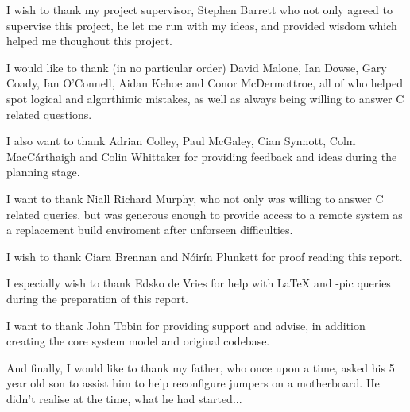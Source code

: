 
I wish to thank my project supervisor, Stephen Barrett who not only
agreed to supervise this project, he let me run with my ideas, and 
provided wisdom which helped me thoughout this project.

\vspace{5mm}

I would like to thank (in no particular order) David Malone, 
Ian Dowse, Gary Coady, Ian O'Connell, Aidan Kehoe and 
Conor McDermottroe, all of who helped spot logical and algorthimic 
mistakes, as well as always being willing to answer C related 
questions.


I also want to thank Adrian Colley, Paul McGaley, Cian Synnott, Colm
MacC\'{a}rthaigh and Colin Whittaker for providing feedback and ideas 
during the planning stage.


I want to thank Niall Richard Murphy, who not only was willing to answer
C related queries, but was generous enough to provide access to a remote
system as a replacement build enviroment after unforseen difficulties.

\vspace{5mm}

I wish to thank Ciara Brennan and N\'{o}ir\'{i}n Plunkett for proof
reading this report. 


I especially wish to thank Edsko de Vries for help with \LaTeX{} 
and \Xy-pic queries during the preparation of this report.

\vspace{5mm}

I want to thank John Tobin for providing support and advise, in 
addition creating the core system model and original codebase.

\vspace{5mm}

And finally, I would like to thank my father, who once upon a time, 
asked his 5 year old son to assist him to help reconfigure jumpers on
a motherboard. He didn't realise at the time, what he had started...
